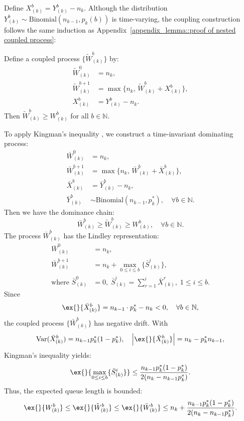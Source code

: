 Define $X_{(k)}^b = Y_{(k)}^b - n_k$. Although the distribution $Y_{(k)}^b\sim \text{Binomial}(n_{k-1},p_k(b))$ is time-varying, the coupling construction follows the same induction as Appendix~\ref{appendix_lemma::proof of nested coupled process}:
\begin{lemma}\label{lemma: coupling, time varying}
Define a coupled process $\{ \tilde{W}_{(k)}^b\}$ by:
\begin{equation*}
\begin{aligned}
\tilde{W}_{(k)}^0 &= n_k, \\
\tilde{W}_{(k)}^{b+1} &= \max\{ n_k, \, \tilde{W}_{(k)}^b+X_{(k)}^b\}, \\
X_{(k)}^b &= Y_{(k)}^b - n_k.
\end{aligned}
\end{equation*}
Then $\tilde{W}^b_{(k)}\geq W^b_{(k)}$ for all $b\in \mathbb{N}$.
\end{lemma}
To apply Kingman's inequality \citep{kingman1962queues}, we construct a time-invariant dominating process:
\begin{equation*}
\begin{aligned}
\bar{W}_{(k)}^0 &= n_k, \\
\bar{W}_{(k)}^{b+1} &= \max\{ n_k,\, \bar{W}_{(k)}^{b}+\bar{X}_{(k)}^b \}, \\
\bar{X}_{(k)}^b &= \bar{Y}_{(k)}^b  -n_k, \\
\bar{Y}_{(k)}^b &\sim \text{Binomial}(n_{k-1}, p_k^*), \quad \forall b\in \mathbb{N}.
\end{aligned}
\end{equation*}
Then we have the dominance chain:
$$\bar{W}^b_{(k)}\geq \tilde{W}^b_{(k)}\geq W^b_{(k)},\quad \forall b\in \mathbb{N}.$$
The process $\bar{W}^b_{(k)}$ has the Lindley representation:
\begin{equation*}
\begin{aligned}
\bar{W}_{(k)}^0 &= n_k, \\
\bar{W}_{(k)}^{b+1} &= n_k + \max_{0\leq i\leq b}\{ \bar{S}_{(k)}^i \}, \\
\text{where } \bar{S}_{(k)}^0 &= 0,\; \bar{S}_{(k)}^i = \sum_{r=1}^i \bar{X}_{(k)}^{r},\; 1\leq i\leq b.
\end{aligned}
\end{equation*}
Since
$$ \ex{}{\bar{X}_{(k)}^b} = n_{k-1}\cdot p_{k}^* - n_k <0,\quad \forall b\in \mathbb{N}, $$
the coupled process $\{\bar{W}_{(k)}^b \}$ has negative drift. With
$$\text{Var}(\bar{X}_{(k)}^b) = n_{k-1}p_k^*(1-p_k^*),\quad \left|\ex{}{\bar{X}_{(k)}^b}\right|=n_k - p_k^* n_{k-1},$$
Kingman's inequality \citep{kingman1962queues} yields:
$$\ex{}{\max_{0\leq i\leq b}\{ \bar{S}_{(k)}^i \}  }\leq  \frac{  n_{k-1}p_k^*(1-p_k^*) }{ 2(n_k - n_{k-1}p_k^*)}. $$
Thus, the expected queue length is bounded:
$$\ex{}{W_{(k)}^b}\leq \ex{}{\tilde{W}_{(k)}^b}\leq \ex{}{\bar{W}_{(k)}^b} \leq n_k + \frac{  n_{k-1}p_k^*(1-p_k^*) }{ 2(n_k - n_{k-1}p_k^*)}.$$
